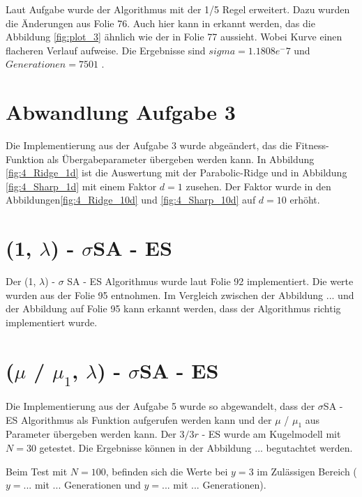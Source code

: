 Laut Aufgabe wurde der Algorithmus mit der 1/5 Regel erweitert. Dazu wurden die Änderungen aus Folie 76. Auch hier kann in erkannt werden, das die Abbildung \ref{fig:plot_3} ähnlich wie der in Folie 77 aussieht. Wobei Kurve einen flacheren Verlauf aufweise. Die Ergebnisse sind $sigma = 1.1808e^-7$ und $Generationen = 7501$ .


\chapter{Abwandlung Aufgabe 3}

Die Implementierung aus der Aufgabe 3 wurde abgeändert, das die Fitness-Funktion als Übergabeparameter übergeben werden kann. In Abbildung \ref{fig:4_Ridge_1d} ist die Auswertung mit der Parabolic-Ridge und in Abbildung \ref{fig:4_Sharp_1d} mit einem Faktor $d=1$ zusehen. Der Faktor wurde in den Abbildungen\ref{fig:4_Ridge_10d} und \ref{fig:4_Sharp_10d} auf $d=10$ erhöht.



\chapter{(1, $\lambda$) - $\sigma$SA - ES}

Der (1, $\lambda$) - $\sigma$ SA - ES Algorithmus wurde laut Folie 92 implementiert. Die werte wurden aus der Folie 95 entnohmen. Im Vergleich zwischen der Abbildung  ... und der Abbildung auf Folie 95 kann erkannt werden, dass der Algorithmus richtig implementiert wurde.


\chapter{($\mu$ / $\mu_1$, $\lambda$) - $\sigma$SA - ES}

Die Implementierung aus der Aufgabe 5 wurde so abgewandelt, dass der $\sigma$SA - ES Algorithmus als Funktion aufgerufen werden kann und der $\mu$ / $\mu_1$ aus Parameter übergeben werden kann. Der $3/3r$ - ES wurde am Kugelmodell mit $N = 30$ getestet. Die Ergebnisse können in der Abbildung  ... begutachtet werden.


Beim Test mit $N = 100$, befinden sich die Werte bei $y=3$ im Zulässigen Bereich ($y = ...$ mit $...$ Generationen und $y=...$ mit $...$ Generationen).

